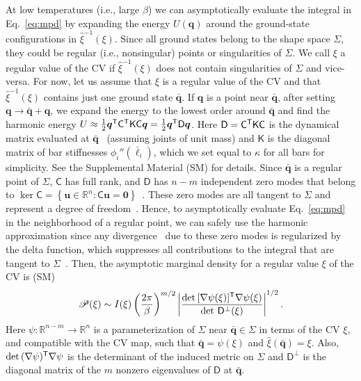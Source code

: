 At low temperatures (i.e., large $\beta$) we can asymptotically evaluate the integral in Eq.~\eqref{eq:mpd} by expanding the energy $U(\bm{q})$ around the ground-state configurations in $\hat{\xi}^{-1}(\xi)$.
Since all ground states belong to the shape space $\Sigma$, they could be regular (i.e., nonsingular) points or singularities of $\Sigma$.
We call $\xi$ a regular value of the CV if $\hat{\xi}^{-1}(\xi)$ does not contain singularities of $\Sigma$ and vice-versa.
For now, let us assume that $\xi$ is a regular value of the CV and that $\hat{\xi}^{-1}(\xi)$ contains just one ground state $\bar{\bm{q}}$.
If $\bm{q}$ is a point near $\bar{\bm{q}}$, after setting $\bm{q} \to \bar{\bm{q}} + \bm{q}$, we expand the energy to the lowest order around $\bar{\bm{q}}$ and find the harmonic energy $U \approx \frac{1}{2}\bm{q}^\mathsf{T}\mathsf{C}^\mathsf{T}\mathsf{K}\mathsf{C}\bm{q} = \frac{1}{2}\bm{q}^\mathsf{T}\mathsf{D}\bm{q}$.
Here $\mathsf{D} = \mathsf{C}^\mathsf{T}\mathsf{K}\mathsf{C}$ is the dynamical matrix evaluated at $\bar{\bm{q}}$~\cite{lubensky2015} (assuming joints of unit mass) and $\mathsf{K}$ is the diagonal matrix of bar stiffnesses $\phi_{i}''(\bar{\ell}_{i})$, which we set equal to $\kappa$ for all bars for simplicity.
See the Supplemental Material (SM) for details.
Since $\bar{\bm{q}}$ is a regular point of $\Sigma$, $\mathsf{C}$ has full rank, and $\mathsf{D}$ has $n-m$ independent zero modes that belong to $\ker\mathsf{C} = \left\{\bm{u} \in \mathbb{R}^{n}: \mathsf{C}\bm{u} = \bm{0}\right\}$~\cite{lubensky2015}.
These zero modes are all tangent to $\Sigma$ and represent a degree of freedom~\cite{leimkuhler2005}.
Hence, to asymptotically evaluate Eq.~\eqref{eq:mpd} in the neighborhood of a regular point, we can safely use the harmonic approximation since any divergence~\cite{schwarz1979,ellis1981,rocklin2018} due to these zero modes is regularized by the delta function, which suppresses all contributions to the integral that are tangent to $\Sigma$~\cite{ramond1997}.
Then, the asymptotic marginal density for a regular value $\xi$ of the CV is (SM)
%
\begin{equation}
  \mathscr{P}(\xi) \sim I(\xi)\left(\frac{2\pi}{\beta}\right)^{m/2}
  \left|\frac{\det\,[\nabla\psi(\xi)]^\mathsf{T}\nabla\psi(\xi)}{\det\,\mathsf{D}^{\perp}(\xi)}\right|^{1/2}.
  \label{eq:mpd_regular}
\end{equation}
%
Here $\psi: \mathbb{R}^{n-m} \to \mathbb{R}^{n}$ is a parameterization of $\Sigma$ near $\bar{\bm{q}} \in \Sigma$ in terms of the CV $\xi$, and compatible with the CV map, such that $\bar{\bm{q}} = \psi(\xi)$ and $\hat{\xi}(\bar{\bm{q}}) = \xi$.
Also, $\det\,(\nabla\psi)^\mathsf{T}\nabla\psi$ is the determinant of the induced metric on $\Sigma$ and $\mathsf{D}^{\perp}$ is the diagonal matrix of the $m$ nonzero eigenvalues of $\mathsf{D}$ at $\bar{\bm{q}}$.

